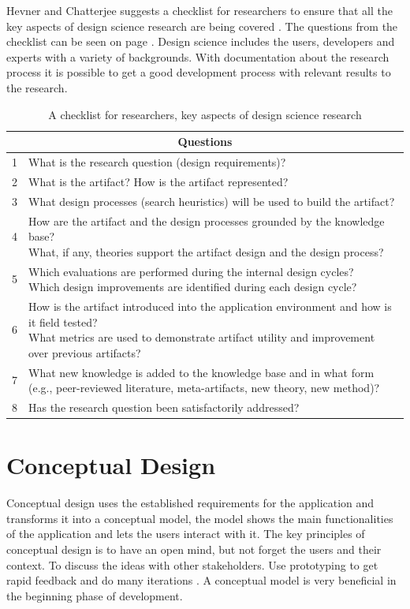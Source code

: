 Hevner and Chatterjee suggests a checklist for researchers to ensure that all the key aspects of design science research are being covered \cite{Hevner2010}. The questions from the checklist can be seen on page \pageref{tab:1} . Design science includes the users, developers and experts with a variety of backgrounds. With documentation about the research process it is possible to get a good development process with relevant results to the research.

\newpage
\begin{table}[H]
\begin{tabular}{ |l|l| }
  \hline
  \multicolumn{2}{|c|}{Questions} \\
  \hline
1 & What is the research question (design requirements)?\\ 
\hline
2 & What is the artifact? How is the artifact represented?\\
\hline
3 & What design processes (search heuristics) will be used to build the artifact?\\ 
\hline
4 &\makecell[l]{ How are the artifact and the design processes grounded by the knowledge base? \\What, if any, theories support the artifact design and the design process?} \\
\hline
5 &\makecell[l]{ Which evaluations are performed during the internal design cycles?\\ Which design improvements are identified during each design cycle?}\\ 
\hline
6 & \makecell[l]{How is the artifact introduced into the application environment and how is it field tested?\\ What metrics are used to demonstrate artifact utility and improvement over previous artifacts?}\\ 
\hline
7 &\makecell[l]{ What new knowledge is added to the knowledge base and in what form \\ (e.g., peer-reviewed literature, meta-artifacts, new theory, new method)?}\\ 
\hline
8 & Has the research question been satisfactorily addressed?\\
 \hline
  
\end{tabular}
\label{tab:1}
\caption{A checklist for researchers, key aspects of design science research}
\end{table}

\section{Conceptual Design} \label{concept}
Conceptual design uses the established requirements for the application and transforms it into a conceptual model\cite{interactiondesignbook}, the model shows the main functionalities of the application and lets the users interact with it. The key principles of conceptual design is to have an open mind, but not forget the users and their context. To discuss the ideas with other stakeholders. Use prototyping to get rapid feedback and do many iterations \cite{interactiondesignbook}. A conceptual model is very beneficial in the beginning phase of development.
